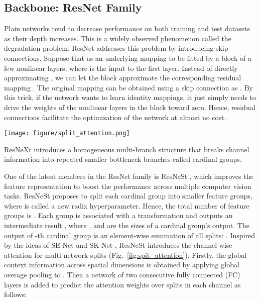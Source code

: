 \documentclass[review, sort&compress]{elsarticle}
\begin{document}
\subsection{Backbone: ResNet Family}
Plain networks tend to decrease performance on both training and test datasets as their depth increases. This is a widely observed phenomenon called the degradation problem. ResNet \cite{he2016deep} addresses this problem by introducing skip connections.
Suppose that  as an underlying mapping to be fitted by a block of a few nonlinear layers, where  is the input to the first layer. Instead of directly approximating , we can let the block approximate the corresponding residual mapping . The original mapping can be obtained using a skip connection as . By this trick, if the network wants to learn identity mappings, it just simply needs to drive the weights of the nonlinear layers in the block toward zero. Hence, residual connections facilitate the optimization of the network at almost no cost.

\begin{figure*}[h!]
\centering
\texttt{[image: figure/split\_attention.png]}
\caption{Split attention in the -th cardinal group with  splits.}
\label{fig:spit_attention}
\end{figure*}

ResNeXt \cite{xie2017aggregated} introduces a homogeneous multi-branch structure that breaks channel information into  repeated smaller bottleneck branches called cardinal groups.

One of the latest members in the ResNet family is ResNeSt \cite{zhang2020resnest}, which improves the feature representation to boost the performance across multiple computer vision tasks. ResNeSt proposes to split each cardinal group into  smaller feature groups, where  is called a new radix hyperparameter. Hence, the total number of feature groups is . Each group is associated with a transformation  and outputs an intermediate result , where , and  are the sizes of a cardinal group's output. The output of -th cardinal group is an element-wise summation of all  splits: . Inspired by the ideas of SE-Net \cite{hu2018squeeze} and SK-Net \cite{li2019selective}, ResNeSt introduces the channel-wise attention for multi network splits (Fig.~\ref{fig:spit_attention}). Firstly, the global context information across spatial dimensions  is obtained by applying global average pooling to . Then a network  of two consecutive fully connected (FC) layers is added to predict the attention weights over splits in each channel  as follows:
\end{document}
